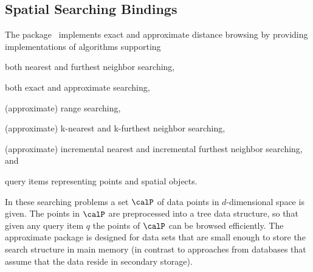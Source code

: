 \subsection{Spatial Searching Bindings}
\label{ssec:modules:ss}
The \dDSpatialSearchingPackage{} package~\cite{cgal:tf-ssd-21a} implements exact and approximate distance browsing by providing implementations of algorithms supporting
\begin{compactenum}
\item both nearest and furthest neighbor searching,
\item both exact and approximate searching,
\item (approximate) range searching,
\item (approximate) k-nearest and k-furthest neighbor searching,
\item (approximate) incremental nearest and incremental furthest neighbor searching, and
\item query items representing points and spatial objects.
\end{compactenum}
In these searching problems a set $\calP$ of data points in $d$-dimensional space is given. The points in $\calP$ are preprocessed into a tree data structure, so that given any query item $q$ the points of $\calP$ can be browsed efficiently. The approximate \dDSpatialSearchingPackage{} package is designed for data sets that are small enough to store the search structure in main memory (in contrast to approaches from databases that assume that the data reside in secondary storage).

\begin{table}[!htp]
  \caption{\dDSpatialSearchingPackage{} module flags}
  \centering{}
 \label{tab:ss}
\end{table}


